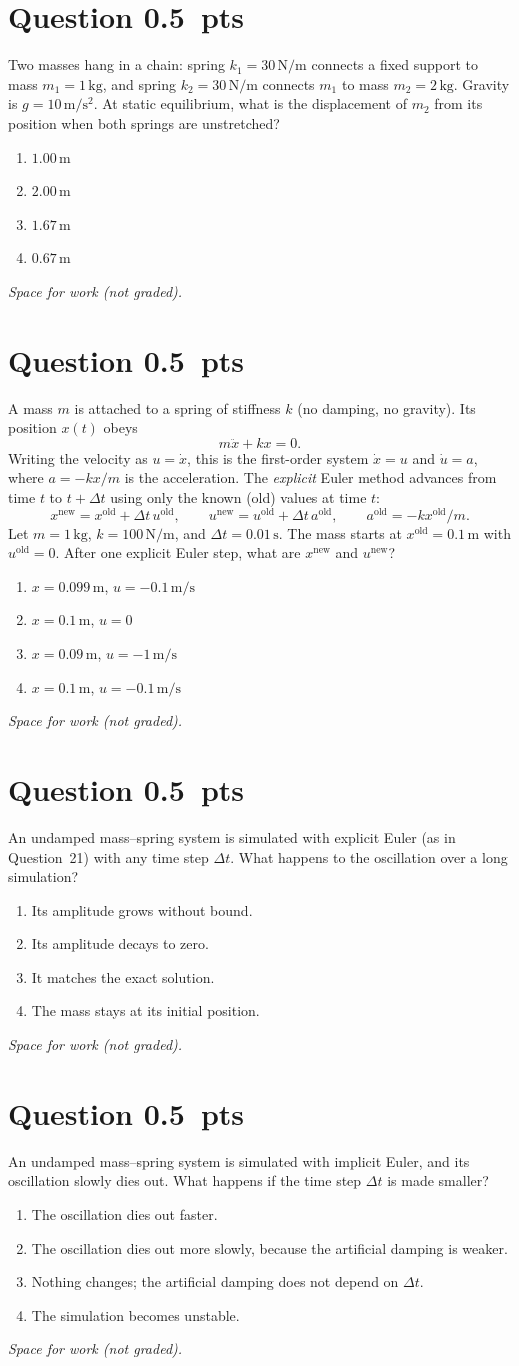 \documentclass[letterpaper,11pt]{article}
\newcounter{qnum}
\newcommand{\qpts}{0.5}
\newcommand{\mcq}[5]{%
  \clearpage
  \stepcounter{qnum}%
  \section*{Question \theqnum \hfill \normalsize \qpts~pts}
  #1
  \begin{enumerate}[label=(\alph*)]
    \item #2
    \item #3
    \item #4
    \item #5
  \end{enumerate}
  \vspace{3mm}

  \textit{Space for work (not graded).}
}
\begin{document}
%
%
\mcq{Two masses hang in a chain: spring $k_1 = 30\,\mathrm{N/m}$ connects a fixed support to mass $m_1 = 1\,\mathrm{kg}$, and spring $k_2 = 30\,\mathrm{N/m}$ connects $m_1$ to mass $m_2 = 2\,\mathrm{kg}$. Gravity is $g = 10\,\mathrm{m/s^2}$. At static equilibrium, what is the displacement of $m_2$ from its position when both springs are unstretched?}
  {$1.00\,\mathrm{m}$}
  {$2.00\,\mathrm{m}$}
  {$1.67\,\mathrm{m}$}
  {$0.67\,\mathrm{m}$}

%
%
\mcq{A mass $m$ is attached to a spring of stiffness $k$ (no damping, no gravity). Its position $x(t)$ obeys \[ m \ddot{x} + k x = 0. \] Writing the velocity as $u = \dot{x}$, this is the first-order system $\dot{x} = u$ and $\dot{u} = a$, where $a = -k x / m$ is the acceleration. The \emph{explicit} Euler method advances from time $t$ to $t + \Delta t$ using only the known (old) values at time $t$: \[ x^{\text{new}} = x^{\text{old}} + \Delta t\, u^{\text{old}}, \qquad u^{\text{new}} = u^{\text{old}} + \Delta t\, a^{\text{old}}, \qquad a^{\text{old}} = -k x^{\text{old}} / m. \] Let $m = 1\,\mathrm{kg}$, $k = 100\,\mathrm{N/m}$, and $\Delta t = 0.01\,\mathrm{s}$. The mass starts at $x^{\text{old}} = 0.1\,\mathrm{m}$ with $u^{\text{old}} = 0$. After one explicit Euler step, what are $x^{\text{new}}$ and $u^{\text{new}}$?}
  {$x = 0.099\,\mathrm{m}$, $u = -0.1\,\mathrm{m/s}$}
  {$x = 0.1\,\mathrm{m}$, $u = 0$}
  {$x = 0.09\,\mathrm{m}$, $u = -1\,\mathrm{m/s}$}
  {$x = 0.1\,\mathrm{m}$, $u = -0.1\,\mathrm{m/s}$}

%
%
\mcq{An undamped mass--spring system is simulated with explicit Euler (as in Question~21) with any time step $\Delta t$. What happens to the oscillation over a long simulation?}
  {Its amplitude grows without bound.}
  {Its amplitude decays to zero.}
  {It matches the exact solution.}
  {The mass stays at its initial position.}

%
%
\mcq{An undamped mass--spring system is simulated with implicit Euler, and its oscillation slowly dies out. What happens if the time step $\Delta t$ is made smaller?}
  {The oscillation dies out faster.}
  {The oscillation dies out more slowly, because the artificial damping is weaker.}
  {Nothing changes; the artificial damping does not depend on $\Delta t$.}
  {The simulation becomes unstable.}
\end{document}
